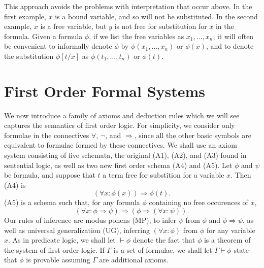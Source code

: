 This approach avoids the problems with interpretation that occur above. In the first example, $x$ is a bound variable, and so will not be substituted. In the second example, $x$ is a free variable, but $y$ is not free for substitution for $x$ in the formula. Given a formula $\phi$, if we list the free variables as $x_1, \dots, x_n$, it will often be convenient to informally denote $\phi$ by $\phi(x_1,\dots,x_n)$ or $\phi(x)$, and to denote the substitution $\phi[t/x]$ as $\phi(t_1,\dots,t_n)$ or $\phi(t)$.

\section{First Order Formal Systems}

We now introduce a family of axioms and deduction rules which we will see captures the semantics of first order logic. For simplicity, we consider only formulae in the connectives $\forall$, $\neg$, and $\Rightarrow$, since all the other basic symbols are equivalent to formulae formed by these connectives. We shall use an axiom system consisting of five schemata, the original (A1), (A2), and (A3) found in sentential logic, as well as two new first order schema (A4) and (A5). Let $\phi$ and $\psi$ be formula, and suppose that $t$ a term free for substition for a variable $x$. Then (A4) is
%
\[ (\forall x: \phi(x)) \Rightarrow \phi(t). \]
%
(A5) is a schema such that, for any formula $\phi$ containing no free occurences of $x$,
%
\[ (\forall x: \phi \Rightarrow \psi) \Rightarrow (\phi \Rightarrow (\forall x: \psi)). \]
%
Our rules of inference are modus ponens (MP), to infer $\psi$ from $\phi$ and $\phi \Rightarrow \psi$, as well as universal generalization (UG), inferring $(\forall x: \phi)$ from $\phi$ for any variable $x$. As in predicate logic, we shall let $\vdash \phi$ denote the fact that $\phi$ is a theorem of the system of first order logic. If $\Gamma$ is a set of formulae, we shall let $\Gamma \vdash \phi$ state that $\phi$ is provable assuming $\Gamma$ are additional axioms.

